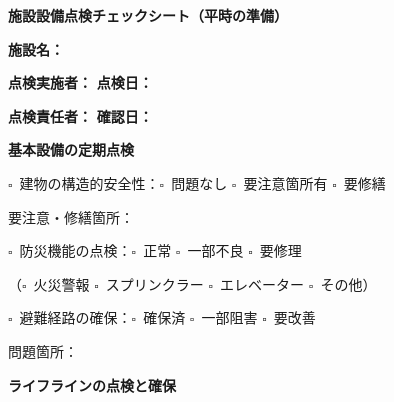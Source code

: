 \documentclass[a4paper,12pt]{jarticle}
\newcommand{\checkbox}{$\square$\ }
\newcommand{\underlinespace}[1]{\underline{\hspace{#1}}}
\begin{document}
\begin{center}
{\Large\textbf{施設設備点検チェックシート（平時の準備）}}
\end{center}
\vspace{5mm}

\noindent
\textbf{施設名：} \underlinespace{8cm}

\vspace{3mm}

\noindent
\textbf{点検実施者：} \underlinespace{4cm} \quad \textbf{点検日：} \underlinespace{3cm}

\vspace{3mm}

\noindent
\textbf{点検責任者：} \underlinespace{4cm} \quad \textbf{確認日：} \underlinespace{3cm}

\vspace{8mm}

\begin{center}
\textbf{\large 基本設備の定期点検}
\end{center}

\vspace{3mm}

\noindent
\checkbox 建物の構造的安全性：\checkbox 問題なし \quad \checkbox 要注意箇所有 \quad \checkbox 要修繕

\vspace{2mm}

\noindent
要注意・修繕箇所：\underlinespace{10cm}

\vspace{3mm}

\noindent
\checkbox 防災機能の点検：\checkbox 正常 \quad \checkbox 一部不良 \quad \checkbox 要修理

\vspace{2mm}

\noindent
（\checkbox 火災警報 \quad \checkbox スプリンクラー \quad \checkbox エレベーター \quad \checkbox その他）

\vspace{3mm}

\noindent
\checkbox 避難経路の確保：\checkbox 確保済 \quad \checkbox 一部阻害 \quad \checkbox 要改善

\vspace{2mm}

\noindent
問題箇所：\underlinespace{10cm}

\vspace{8mm}

\begin{center}
\textbf{\large ライフラインの点検と確保}
\end{center}
\end{document}
